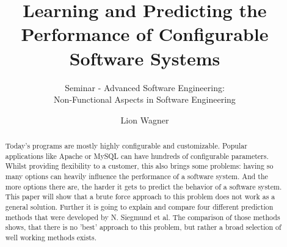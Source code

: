 \documentclass[pdftex,english,oribibl]{llncs}
\title{Learning and Predicting the Performance of Configurable Software Systems}
\subtitle{Seminar - Advanced Software Engineering:\\
Non-Functional Aspects in Software Engineering}
\author{Lion Wagner}
\institute{University of Stuttgart\\Institute of Software Technology (ISTE)\\70569 Stuttgart, Germany}
\begin{document}
\maketitle
\begin{abstract}
  Today's programs are mostly highly configurable and customizable. Popular applications like Apache or MySQL can have hundreds of configurable parameters. Whilst providing flexibility to a customer, this also brings some problems: having so many options can heavily influence the performance of a software system. And the more options there are, the harder it gets to predict the behavior of a software system. This paper will show that a brute force approach to this problem does not work as a general solution. Further it is going to explain and compare four different prediction methods that were developed by N. Siegmund et al. The comparison of those methods shows, that there is no 'best' approach to this problem, but rather a broad selection of well working methods exists. 
\end{abstract}







%




%


\end{document}
